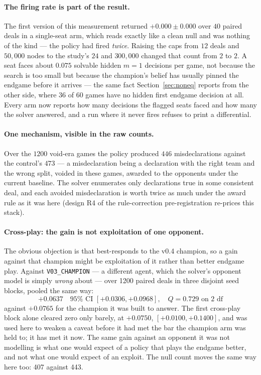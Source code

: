 \documentclass[11pt,a4paper]{article}
\begin{document}
\paragraph{The firing rate is part of the result.} The first version of this
measurement returned $+0.000 \pm 0.000$ over $40$ paired deals in a
single-seat arm, which reads exactly like a clean null and was nothing of the
kind --- the policy had fired \emph{twice}. Raising the caps from $12$ deals
and $50{,}000$ nodes to the study's $24$ and $300{,}000$ changed that count from
$2$ to $2$. A seat faces about $0.075$ solvable hidden $m = 1$ decisions per
game, not because the search is too small but because the champion's belief has
usually pinned the endgame before it arrives --- the same fact
Section~\ref{sec:noneq} reports from the other side, where $36$ of $60$ games
have no hidden first endgame decision at all. Every arm now reports how many
decisions the flagged seats faced and how many the solver answered, and a run
where it never fires refuses to print a differential.

\paragraph{One mechanism, visible in the raw counts.} Over the $1200$
void-era games the policy produced $446$ misdeclarations against the
control's $473$ --- a misdeclaration being a declaration with the right team
and the wrong split, voided in these games, awarded to the opponents under
the current baseline. The solver enumerates only declarations true in some
consistent deal, and each avoided misdeclaration is worth twice as much
under the award rule as it was here (design R4 of the rule-correction
pre-registration re-prices this stack).

\paragraph{Cross-play: the gain is not exploitation of one opponent.} The
obvious objection is that  best-responds to the v0.4
champion, so a gain against that champion might be exploitation of it rather
than better endgame play. Against \texttt{V03\_CHAMPION} --- a different agent,
which the solver's opponent model is simply \emph{wrong} about --- over
1200 paired deals in three disjoint seed
blocks, pooled the same way:
\[
  +0.0637 \quad 95\%\text{ CI } [+0.0306, +0.0968], \quad Q = 0.729 \text{ on } 2 \text{ df}
\]
against $+0.0765$ for the champion it was built to answer. The first
cross-play block alone cleared zero only barely, at
$+0.0750$, $[+0.0100, +0.1400]$, and was used here to weaken a caveat before it
had met the bar the champion arm was held to; it has met it now. The same gain
against an opponent it was not modelling is what one would expect of a policy
that plays the endgame better, and not what one would expect of an exploit. The
null count moves the same way here too: 407 against 443.
\end{document}
